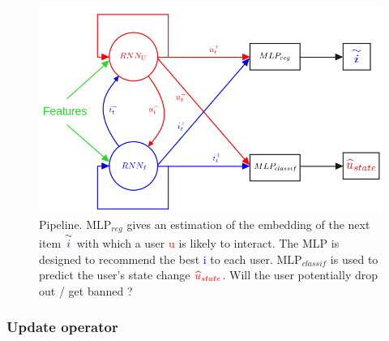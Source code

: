 \begin{figure}[H]
   
    \begin{center}
                \includegraphics[scale = 0.4]{image/pipeline.png}

    \end{center}
    \caption{Pipeline. $\text{MLP}_{reg}$ gives an estimation of the embedding of the next item $\textcolor{blue}{\overset{\sim}{i}}$ with which a user \textcolor{red}{u} is likely to interact. The MLP  is designed to recommend the best \textcolor{blue}{i} to each user. $\text{MLP}_{classif}$ is used to predict the user's state change $\textcolor{red}{\widehat u_{state}}$. Will the user potentially drop out / get banned ?}
     \label{Pipeline}
\end{figure}

\subsubsection{Update operator}

